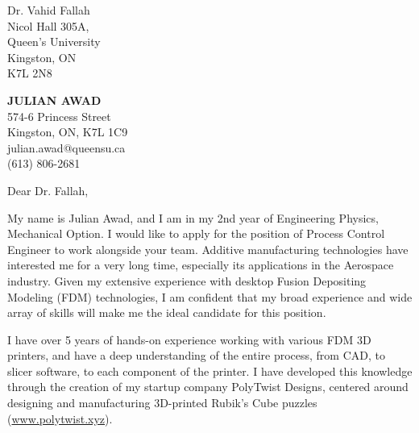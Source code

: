 \documentclass[11pt]{letter} %
\begin{document}
\begin{letter}{Dr. Vahid Fallah \\
Nicol Hall 305A, \\
Queen's University \\
Kingston, ON \\
K7L 2N8}

\begin{center}
\textbf{\huge JULIAN AWAD} \\ %
\vspace{1em} %
574-6 Princess Street \\ Kingston, ON, K7L 1C9 \\ julian.awad@queensu.ca \\ (613) 806-2681 %
\end{center}
\hspace{0em}
\signature{Julian Awad} %
\vspace{-1in}
\opening{Dear Dr. Fallah,}

My name is Julian Awad, and I am in my 2nd year of Engineering Physics, Mechanical Option. I would like to apply for the position of Process Control Engineer to work alongside your team. Additive manufacturing technologies have interested me for a very long time, especially its applications in the Aerospace industry. Given my extensive experience with desktop Fusion Depositing Modeling (FDM) technologies, I am confident that my broad experience and wide array of skills will make me the ideal candidate for this position.

I have over 5 years of hands-on experience working with various FDM 3D printers, and have a deep understanding of the entire process, from CAD, to slicer software, to each component of the printer. I have developed this knowledge through the creation of my startup company PolyTwist Designs, centered around designing and manufacturing 3D-printed Rubik's Cube puzzles (\url{www.polytwist.xyz}).


\end{letter}
\end{document}
